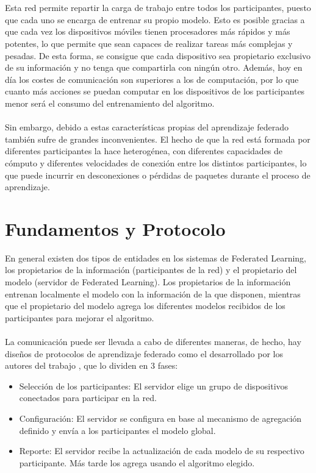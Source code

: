 \\ \\
Esta red permite repartir la carga de trabajo entre todos los participantes, puesto que cada uno se encarga de entrenar su propio modelo. Esto es posible gracias a que cada vez los dispositivos móviles tienen procesadores más rápidos y más potentes, lo que permite que sean capaces de realizar tareas más complejas y pesadas. De esta forma, se consigue que cada dispositivo sea propietario exclusivo de su información y no tenga que compartirla con ningún otro. Además, hoy en día los costes de comunicación son superiores a los de computación, por lo que cuanto más acciones se puedan computar en los dispositivos de los participantes menor será el consumo del entrenamiento del algoritmo. 
\\ \\
Sin embargo, debido a estas características propias del aprendizaje federado también sufre de grandes inconvenientes. El hecho de que la red está formada por diferentes participantes la hace heterogénea, con diferentes capacidades de cómputo y diferentes velocidades de conexión entre los distintos participantes, lo que puede incurrir en desconexiones o pérdidas de paquetes durante el proceso de aprendizaje.

\section{Fundamentos y Protocolo}
En general existen dos tipos de entidades en los sistemas de Federated Learning, los propietarios de la información (participantes de la red) y el propietario del modelo (servidor de Federated Learning). Los propietarios de la información entrenan localmente el modelo con la información de la que disponen, mientras que el propietario del modelo agrega los diferentes modelos recibidos de los participantes para mejorar el algoritmo. 
\\ \\
La comunicación puede ser llevada a cabo de diferentes maneras, de hecho, hay diseños de protocolos de aprendizaje federado como el desarrollado por los autores del trabajo \autocite{bonawitzFederatedLearningScale2019}, que lo dividen en 3 fases:

\begin{itemize}
    \item Selección de los participantes: El servidor elige un grupo de dispositivos conectados para participar en la red.
    \item Configuración: El servidor se configura en base al mecanismo de agregación definido y envía a los participantes el modelo global.
    \item Reporte: El servidor recibe la actualización de cada modelo de su respectivo participante. Más tarde los agrega usando el algoritmo elegido.
\end{itemize}

